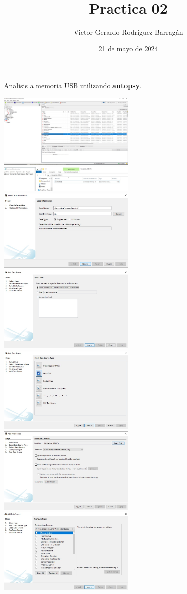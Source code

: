 \documentclass{article}
\title{Practica 02}
\author{Victor Gerardo Rodríguez Barragán}
\date{21 de mayo de 2024}
\begin{document}
\maketitle

Analisis a memoria USB utilizando \textbf{autopsy}.

\begin{center}
    \includegraphics[width=0.5\textwidth]{01.jpeg}
    \includegraphics[width=0.5\textwidth]{02.jpeg}
    \includegraphics[width=0.5\textwidth]{03.jpeg}
    \includegraphics[width=0.5\textwidth]{04.jpeg}
    \includegraphics[width=0.5\textwidth]{05.jpeg}
    \includegraphics[width=0.5\textwidth]{06.jpeg}
    \includegraphics[width=0.5\textwidth]{07.jpeg}
\end{center}
\end{document}
